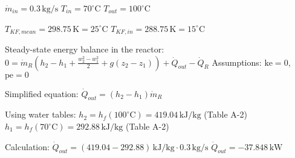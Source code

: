 \( \dot{m}_{in} = 0.3 \, \text{kg/s} \)  
\( T_{in} = 70^\circ \text{C} \)  
\( T_{out} = 100^\circ \text{C} \)  

\( T_{KF,mean} = 298.75 \, \text{K} = 25^\circ \text{C} \)  
\( T_{KF,in} = 288.75 \, \text{K} = 15^\circ \text{C} \)  

Steady-state energy balance in the reactor:  
\( 0 = \dot{m}_R (h_2 - h_1 + \frac{w_2^2 - w_1^2}{2} + g(z_2 - z_1)) + \dot{Q}_{out} - \dot{Q}_R \)  
Assumptions: \( \text{ke} = 0 \), \( \text{pe} = 0 \)  

Simplified equation:  
\( \dot{Q}_{out} = (h_2 - h_1) \dot{m}_R \)  

Using water tables:  
\( h_2 = h_f(100^\circ \text{C}) = 419.04 \, \text{kJ/kg} \) (Table A-2)  
\( h_1 = h_f(70^\circ \text{C}) = 292.88 \, \text{kJ/kg} \) (Table A-2)  

Calculation:  
\( \dot{Q}_{out} = (419.04 - 292.88) \, \text{kJ/kg} \cdot 0.3 \, \text{kg/s} \)  
\( \dot{Q}_{out} = -37.848 \, \text{kW} \)